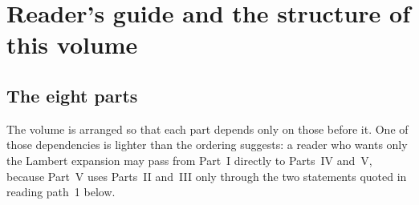 \documentclass[11pt,oneside]{article}
\theoremstyle{plain}
\theoremstyle{definition}
\theoremstyle{remark}
\begin{document}
\begin{abstract}
Two further parts cover the passage from formal transseries to Poincar\'e
asymptotics -- including power--log series near a finite point and the Dulac
conventions -- and the algorithms, residual certificates, and diagnostics
needed to compute with these objects reliably.  Appendices collect the
Bell-polynomial bookkeeping, closed-form coefficient extraction, Lambert
polynomial tables, an operational formula sheet, exercises with solutions, a
concordance with the corpus notation catalogue, and the provenance of the six
absorbed sources.
\end{abstract}

\tableofcontents
\clearpage
\section{Reader's guide and the structure of this volume}
\label{plt:sec:readers-guide}

\subsection{The eight parts}
\label{plt:sec:mot-parts}

The volume is arranged so that each part depends only on those before it.  One
of those dependencies is lighter than the ordering suggests: a reader who wants
only the Lambert expansion may pass from Part~I directly to Parts~IV and~V,
because Part~V uses Parts~II and~III only through the two statements quoted in
reading path~1 below.
\end{document}
